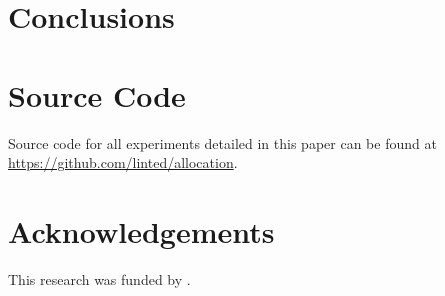 \documentclass[letterpaper, 10 pt, conference]{ieeeconf}  %
\newcommand*\GitHubLoc{https://github.com/linted/allocation}
\begin{document}


\section{Conclusions}


\section{Source Code}

Source code for all experiments detailed in this paper can be found at \url{\GitHubLoc}.



% 
% 

\section{Acknowledgements}

\noindent This research was funded by .

\clearpage
\end{document}
